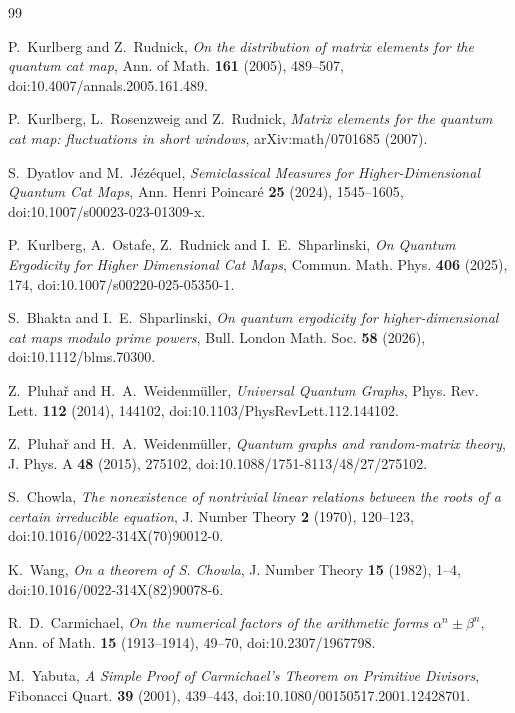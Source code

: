 \documentclass[11pt]{article}
\begin{document}
\begin{thebibliography}{99}

P.~Kurlberg and Z.~Rudnick,
\emph{On the distribution of matrix elements for the quantum cat map},
Ann. of Math. \textbf{161} (2005), 489--507,
doi:10.4007/annals.2005.161.489.

P.~Kurlberg, L.~Rosenzweig and Z.~Rudnick,
\emph{Matrix elements for the quantum cat map: fluctuations in short windows},
arXiv:math/0701685 (2007).

S.~Dyatlov and M.~J\'ez\'equel,
\emph{Semiclassical Measures for Higher-Dimensional Quantum Cat Maps},
Ann. Henri Poincar\'e \textbf{25} (2024), 1545--1605,
doi:10.1007/s00023-023-01309-x.

P.~Kurlberg, A.~Ostafe, Z.~Rudnick and I.~E.~Shparlinski,
\emph{On Quantum Ergodicity for Higher Dimensional Cat Maps},
Commun. Math. Phys. \textbf{406} (2025), 174,
doi:10.1007/s00220-025-05350-1.

S.~Bhakta and I.~E.~Shparlinski,
\emph{On quantum ergodicity for higher-dimensional cat maps modulo prime powers},
Bull. London Math. Soc. \textbf{58} (2026),
doi:10.1112/blms.70300.

Z.~Pluha\v r and H.~A.~Weidenm\"uller,
\emph{Universal Quantum Graphs},
Phys. Rev. Lett. \textbf{112} (2014), 144102,
doi:10.1103/PhysRevLett.112.144102.

Z.~Pluha\v r and H.~A.~Weidenm\"uller,
\emph{Quantum graphs and random-matrix theory},
J. Phys. A \textbf{48} (2015), 275102,
doi:10.1088/1751-8113/48/27/275102.

S.~Chowla,
\emph{The nonexistence of nontrivial linear relations between the roots of a
certain irreducible equation},
J. Number Theory \textbf{2} (1970), 120--123,
doi:10.1016/0022-314X(70)90012-0.

K.~Wang,
\emph{On a theorem of S. Chowla},
J. Number Theory \textbf{15} (1982), 1--4,
doi:10.1016/0022-314X(82)90078-6.

R.~D.~Carmichael,
\emph{On the numerical factors of the arithmetic forms $\alpha^n\pm\beta^n$},
Ann. of Math. \textbf{15} (1913--1914), 49--70,
doi:10.2307/1967798.

M.~Yabuta,
\emph{A Simple Proof of Carmichael's Theorem on Primitive Divisors},
Fibonacci Quart. \textbf{39} (2001), 439--443,
doi:10.1080/00150517.2001.12428701.


\end{thebibliography}
\end{document}

